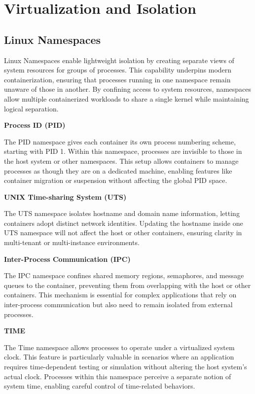 \chapter{Virtualization and Isolation}

\section{Linux Namespaces}

Linux Namespaces enable lightweight isolation by creating separate views of system resources for groups of processes. This capability underpins modern containerization, ensuring that processes running in one namespace remain unaware of those in another. By confining access to system resources, namespaces allow multiple containerized workloads to share a single kernel while maintaining logical separation.

\textbf{Process ID (PID)}

The PID namespace gives each container its own process numbering scheme, starting with PID 1. Within this namespace, processes are invisible to those in the host system or other namespaces. This setup allows containers to manage processes as though they are on a dedicated machine, enabling features like container migration or suspension without affecting the global PID space.

\textbf{UNIX Time-sharing System (UTS)}

The UTS namespace isolates hostname and domain name information, letting containers adopt distinct network identities. Updating the hostname inside one UTS namespace will not affect the host or other containers, ensuring clarity in multi-tenant or multi-instance environments.

\textbf{Inter-Process Communication (IPC)}

The IPC namespace confines shared memory regions, semaphores, and message queues to the container, preventing them from overlapping with the host or other containers. This mechanism is essential for complex applications that rely on inter-process communication but also need to remain isolated from external processes.

\textbf{TIME}

The Time namespace allows processes to operate under a virtualized system clock. This feature is particularly valuable in scenarios where an application requires time-dependent testing or simulation without altering the host system’s actual clock. Processes within this namespace perceive a separate notion of system time, enabling careful control of time-related behaviors.


